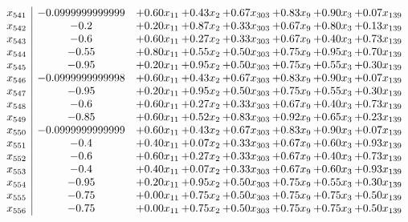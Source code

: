 \documentclass[8pt]{article}
\begin{document}
\[\begin{array}{c| c c@{\hskip 2pt} c@{\hskip 2pt} c@{\hskip 2pt} c@{\hskip 2pt} c@{\hskip 2pt} c@{\hskip 2pt} }
 x_{541}   &  -0.0999999999999 & +  0.60 x_{11} & +  0.43 x_{2} & +  0.67 x_{303} & +  0.83 x_{9} & +  0.90 x_{3} & +  0.07 x_{139}\\
 x_{542}   &  -0.2 & +  0.20 x_{11} & +  0.87 x_{2} & +  0.33 x_{303} & +  0.67 x_{9} & +  0.80 x_{3} & +  0.13 x_{139}\\
 x_{543}   &  -0.6 & +  0.60 x_{11} & +  0.27 x_{2} & +  0.33 x_{303} & +  0.67 x_{9} & +  0.40 x_{3} & +  0.73 x_{139}\\
 x_{544}   &  -0.55 & +  0.80 x_{11} & +  0.55 x_{2} & +  0.50 x_{303} & +  0.75 x_{9} & +  0.95 x_{3} & +  0.70 x_{139}\\
 x_{545}   &  -0.95 & +  0.20 x_{11} & +  0.95 x_{2} & +  0.50 x_{303} & +  0.75 x_{9} & +  0.55 x_{3} & +  0.30 x_{139}\\
 x_{546}   &  -0.0999999999998 & +  0.60 x_{11} & +  0.43 x_{2} & +  0.67 x_{303} & +  0.83 x_{9} & +  0.90 x_{3} & +  0.07 x_{139}\\
 x_{547}   &  -0.95 & +  0.20 x_{11} & +  0.95 x_{2} & +  0.50 x_{303} & +  0.75 x_{9} & +  0.55 x_{3} & +  0.30 x_{139}\\
 x_{548}   &  -0.6 & +  0.60 x_{11} & +  0.27 x_{2} & +  0.33 x_{303} & +  0.67 x_{9} & +  0.40 x_{3} & +  0.73 x_{139}\\
 x_{549}   &  -0.85 & +  0.60 x_{11} & +  0.52 x_{2} & +  0.83 x_{303} & +  0.92 x_{9} & +  0.65 x_{3} & +  0.23 x_{139}\\
 x_{550}   &  -0.0999999999999 & +  0.60 x_{11} & +  0.43 x_{2} & +  0.67 x_{303} & +  0.83 x_{9} & +  0.90 x_{3} & +  0.07 x_{139}\\
 x_{551}   &  -0.4 & +  0.40 x_{11} & +  0.07 x_{2} & +  0.33 x_{303} & +  0.67 x_{9} & +  0.60 x_{3} & +  0.93 x_{139}\\
 x_{552}   &  -0.6 & +  0.60 x_{11} & +  0.27 x_{2} & +  0.33 x_{303} & +  0.67 x_{9} & +  0.40 x_{3} & +  0.73 x_{139}\\
 x_{553}   &  -0.4 & +  0.40 x_{11} & +  0.07 x_{2} & +  0.33 x_{303} & +  0.67 x_{9} & +  0.60 x_{3} & +  0.93 x_{139}\\
 x_{554}   &  -0.95 & +  0.20 x_{11} & +  0.95 x_{2} & +  0.50 x_{303} & +  0.75 x_{9} & +  0.55 x_{3} & +  0.30 x_{139}\\
 x_{555}   &  -0.75 & +  0.00 x_{11} & +  0.75 x_{2} & +  0.50 x_{303} & +  0.75 x_{9} & +  0.75 x_{3} & +  0.50 x_{139}\\
 x_{556}   &  -0.75 & +  0.00 x_{11} & +  0.75 x_{2} & +  0.50 x_{303} & +  0.75 x_{9} & +  0.75 x_{3} & +  0.50 x_{139}\\

\end{array}\]
\end{document}
